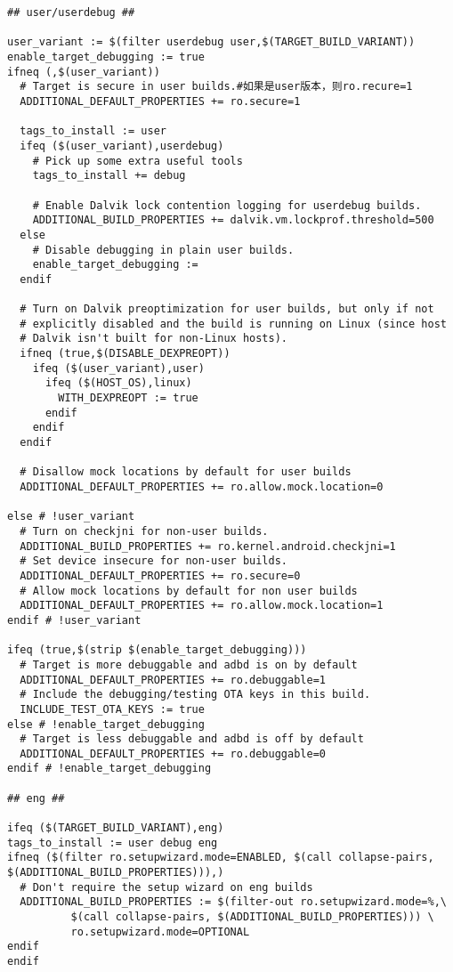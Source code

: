 \documentclass[12pt,a4paper]{article}
\begin{document}
\begin{verbatim}
## user/userdebug ##

user_variant := $(filter userdebug user,$(TARGET_BUILD_VARIANT))
enable_target_debugging := true
ifneq (,$(user_variant))
  # Target is secure in user builds.#如果是user版本，则ro.recure=1
  ADDITIONAL_DEFAULT_PROPERTIES += ro.secure=1

  tags_to_install := user
  ifeq ($(user_variant),userdebug)
    # Pick up some extra useful tools
    tags_to_install += debug

    # Enable Dalvik lock contention logging for userdebug builds.
    ADDITIONAL_BUILD_PROPERTIES += dalvik.vm.lockprof.threshold=500
  else
    # Disable debugging in plain user builds.
    enable_target_debugging :=
  endif

  # Turn on Dalvik preoptimization for user builds, but only if not
  # explicitly disabled and the build is running on Linux (since host
  # Dalvik isn't built for non-Linux hosts).
  ifneq (true,$(DISABLE_DEXPREOPT))
    ifeq ($(user_variant),user)
      ifeq ($(HOST_OS),linux)
        WITH_DEXPREOPT := true
      endif
    endif
  endif

  # Disallow mock locations by default for user builds
  ADDITIONAL_DEFAULT_PROPERTIES += ro.allow.mock.location=0

else # !user_variant
  # Turn on checkjni for non-user builds.
  ADDITIONAL_BUILD_PROPERTIES += ro.kernel.android.checkjni=1
  # Set device insecure for non-user builds.
  ADDITIONAL_DEFAULT_PROPERTIES += ro.secure=0
  # Allow mock locations by default for non user builds
  ADDITIONAL_DEFAULT_PROPERTIES += ro.allow.mock.location=1
endif # !user_variant

ifeq (true,$(strip $(enable_target_debugging)))
  # Target is more debuggable and adbd is on by default
  ADDITIONAL_DEFAULT_PROPERTIES += ro.debuggable=1
  # Include the debugging/testing OTA keys in this build.
  INCLUDE_TEST_OTA_KEYS := true
else # !enable_target_debugging
  # Target is less debuggable and adbd is off by default
  ADDITIONAL_DEFAULT_PROPERTIES += ro.debuggable=0
endif # !enable_target_debugging

## eng ##

ifeq ($(TARGET_BUILD_VARIANT),eng)
tags_to_install := user debug eng
ifneq ($(filter ro.setupwizard.mode=ENABLED, $(call collapse-pairs, $(ADDITIONAL_BUILD_PROPERTIES))),)
  # Don't require the setup wizard on eng builds
  ADDITIONAL_BUILD_PROPERTIES := $(filter-out ro.setupwizard.mode=%,\
          $(call collapse-pairs, $(ADDITIONAL_BUILD_PROPERTIES))) \
          ro.setupwizard.mode=OPTIONAL
endif
endif


\end{verbatim}
\end{document}
